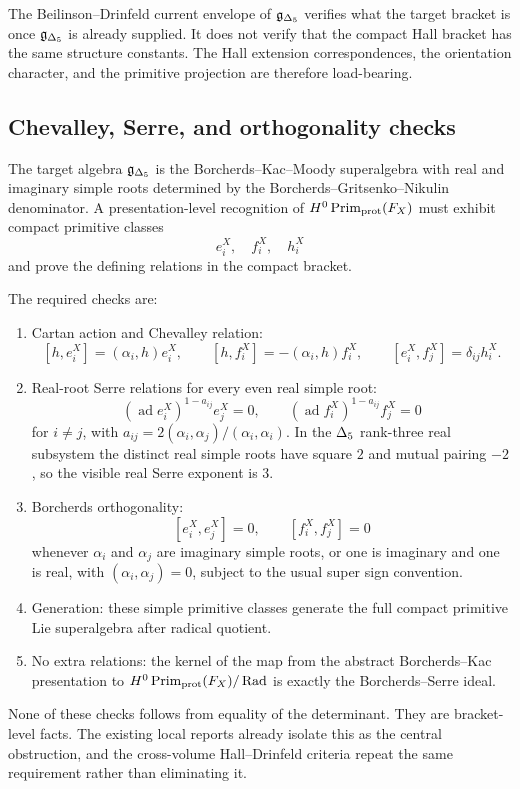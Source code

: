 The Beilinson--Drinfeld current envelope of \(\mathfrak g_{\Delta_{5}}\) verifies what the
target bracket is once \(\mathfrak g_{\Delta_{5}}\) is already supplied.  It does not verify
that the compact Hall bracket has the same structure constants.  The Hall
extension correspondences, the orientation character, and the primitive
projection are therefore load-bearing.

\subsection{Chevalley, Serre, and orthogonality checks}

The target algebra \(\mathfrak g_{\Delta_{5}}\) is the Borcherds--Kac--Moody superalgebra
with real and imaginary simple roots determined by the
Borcherds--Gritsenko--Nikulin denominator.  A presentation-level recognition
of \(H^0\operatorname{Prim}_{\mathrm{prot}}(F_X)\) must exhibit compact primitive classes
\[
   e_i^X,\quad f_i^X,\quad h_i^X
\]
and prove the defining relations in the compact bracket.

The required checks are:
\begin{enumerate}
\item Cartan action and Chevalley relation:
\[
   [h,e_i^X]=(\alpha_i,h)e_i^X,\qquad
   [h,f_i^X]=-(\alpha_i,h)f_i^X,\qquad
   [e_i^X,f_j^X]=\delta_{ij}h_i^X .
\]
\item Real-root Serre relations for every even real simple root:
\[
   (\operatorname{ad}e_i^X)^{1-a_{ij}}e_j^X=0,\qquad
   (\operatorname{ad}f_i^X)^{1-a_{ij}}f_j^X=0
\]
for \(i\neq j\), with \(a_{ij}=2(\alpha_i,\alpha_j)/(\alpha_i,\alpha_i)\).
In the \(\Delta_{5}\) rank-three real subsystem the distinct real simple
roots have square \(2\) and mutual pairing \(-2\), so the visible real
Serre exponent is \(3\).
\item Borcherds orthogonality:
\[
   [e_i^X,e_j^X]=0,\qquad [f_i^X,f_j^X]=0
\]
whenever \(\alpha_i\) and \(\alpha_j\) are imaginary simple roots, or one is
imaginary and one is real, with \((\alpha_i,\alpha_j)=0\), subject to the
usual super sign convention.
\item Generation: these simple primitive classes generate the full compact
primitive Lie superalgebra after radical quotient.
\item No extra relations: the kernel of the map from the abstract
Borcherds--Kac presentation to \(H^0\operatorname{Prim}_{\mathrm{prot}}(F_X)/\operatorname{Rad}\) is exactly the
Borcherds--Serre ideal.
\end{enumerate}

None of these checks follows from equality of the determinant.  They are
bracket-level facts.  The existing local reports already isolate this as the
central obstruction, and the cross-volume Hall--Drinfeld criteria repeat the
same requirement rather than eliminating it.

